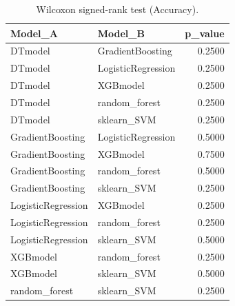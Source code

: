 \begin{table}[t]
\centering
\begin{tabular}{llr}
\toprule
Model_A & Model_B & p_value \\
\midrule
DTmodel & GradientBoosting & 0.2500 \\
DTmodel & LogisticRegression & 0.2500 \\
DTmodel & XGBmodel & 0.2500 \\
DTmodel & random_forest & 0.2500 \\
DTmodel & sklearn_SVM & 0.2500 \\
GradientBoosting & LogisticRegression & 0.5000 \\
GradientBoosting & XGBmodel & 0.7500 \\
GradientBoosting & random_forest & 0.5000 \\
GradientBoosting & sklearn_SVM & 0.2500 \\
LogisticRegression & XGBmodel & 0.2500 \\
LogisticRegression & random_forest & 0.2500 \\
LogisticRegression & sklearn_SVM & 0.5000 \\
XGBmodel & random_forest & 0.2500 \\
XGBmodel & sklearn_SVM & 0.5000 \\
random_forest & sklearn_SVM & 0.2500 \\
\bottomrule
\end{tabular}
\caption{Wilcoxon signed-rank test (Accuracy).}
\label{tab:wilcoxon_Accuracy}
\end{table}